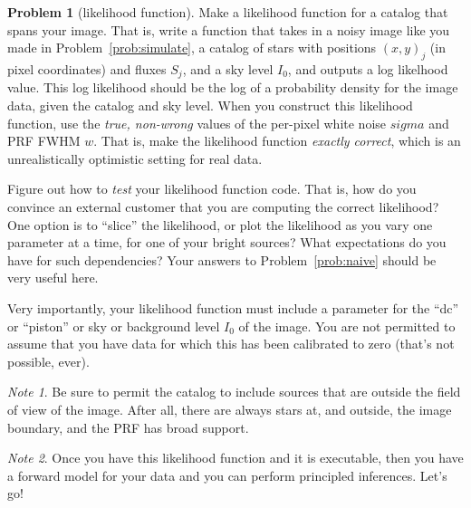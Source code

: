 \documentclass{article}
\theoremstyle{definition}
\newcommand{\problemname}{Problem}
\newtheorem{problem}{\problemname}
\newcommand{\probref}[1]{\problemname~\ref{#1}}
\theoremstyle{remark}
\newcommand{\notename}{Note}
\newtheorem{note}{\notename}[problem]
\begin{document}
\begin{problem}[likelihood function]\label{prob:lf}
Make a likelihood function for a catalog that spans your image.
That is, write a function that takes in a noisy image like you made in \probref{prob:simulate}, a catalog of stars with positions $(x,y)_j$ (in pixel coordinates) and fluxes $S_j$, and a sky level $I_0$, and outputs a log likelhood value.
This log likelihood should be the log of a probability density for the image data, given the catalog and sky level.
When you construct this likelihood function, use the \emph{true, non-wrong} values of the per-pixel white noise $sigma$ and PRF FWHM $w$.
That is, make the likelihood function \emph{exactly correct}, which is an unrealistically optimistic setting for real data.

Figure out how to \emph{test} your likelihood function code.
That is, how do you convince an external customer that you are computing the correct likelihood?
One option is to ``slice'' the likelihood, or plot the likelihood as you vary one parameter at a time, for one of your bright sources?
What expectations do you have for such dependencies?
Your answers to \probref{prob:naive} should be very useful here.

Very importantly, your likelihood function must include a parameter for the ``dc'' or ``piston'' or sky or background level $I_0$ of the image.
You are not permitted to assume that you have data for which this has been calibrated to zero (that's not possible, ever).
\end{problem}

\begin{note}
Be sure to permit the catalog to include sources that are outside the field of view of the image. After all, there are always stars at, and outside, the image boundary, and the PRF has broad support.
\end{note}

\begin{note}
Once you have this likelihood function and it is executable, then you have a forward model for your data and you can perform principled inferences.
Let's go!
\end{note}
\end{document}
